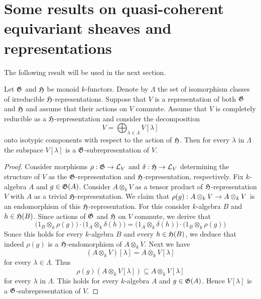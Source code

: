 \section{Some results on quasi-coherent equivariant sheaves and representations}
\noindent
The following result will be used in the next section.

\begin{proposition}\label{proposition:commuting_action_preserves_isotypic_decomposition}
Let ${\mathfrak G}$ and ${\mathfrak H}$ be monoid $k$-functors. Denote by $\Lambda$ the set of isomorphism classes of irreducible ${\mathfrak H}$-representations. Suppose that $V$ is a representation of both ${\mathfrak G}$ and ${\mathfrak H}$ and assume that their actions on $V$ commute. Assume that $V$ is completely reducible as a ${\mathfrak H}$-representation and consider the decomposition
$$V = \bigoplus_{\lambda\in \Lambda}V[\lambda]$$
onto isotypic components with respect to the action of ${\mathfrak H}$. Then for every $\lambda$ in $\Lambda$ the subspace $V[\lambda]$ is a ${\mathfrak G}$-subrepresentation of $V$.
\end{proposition}
\begin{proof}
Consider morphisms $\rho:{\mathfrak G}\rightarrow {\mathcal L}_V$ and $\delta:{\mathfrak H}\rightarrow {\mathcal L}_V$ determining the structure of $V$ as the ${\mathfrak G}$-representation and ${\mathfrak H}$-representation, respectively. Fix $k$-algebra $A$ and $g\in {\mathfrak G}(A)$. Consider $A\otimes_k V$ as a tensor product of ${\mathfrak H}$-representation $V$ with $A$ as a trivial ${\mathfrak H}$-representation. We claim that $\rho(g):A\otimes_kV \rightarrow A\otimes_kV$ is an endomorphism of this ${\mathfrak H}$-representation. For this consider $k$-algebra $B$ and $h\in {\mathfrak H}(B)$. Since actions of ${\mathfrak G}$ and ${\mathfrak H}$ on $V$ commute, we derive that
$$\big(1_B\otimes_k\rho(g)\big)\cdot \big(1_A\otimes_k\delta(h)\big) = \big(1_A\otimes_k\delta(h)\big)\cdot \big(1_B\otimes_k\rho(g)\big)$$
Sonce this holds for every $k$-algebra $B$ and every $h\in {\mathfrak H}(B)$, we deduce that indeed $\rho(g)$ is a ${\mathfrak H}$-endomorphism of $A\otimes_kV$. Next we have
$$\left(A\otimes_kV\right)[\lambda] = A\otimes_k V[\lambda]$$
for every $\lambda \in \Lambda$. Thus
$$\rho(g)\left(A \otimes_k V[\lambda] \right)\subseteq A \otimes_kV[\lambda]$$
for every $\lambda$ in $\Lambda$. This holds for every $k$-algebra $A$ and $g\in {\mathfrak G}(A)$. Hence $V[\lambda]$ is a ${\mathfrak G}$-subrepresentation of $V$.
\end{proof}

